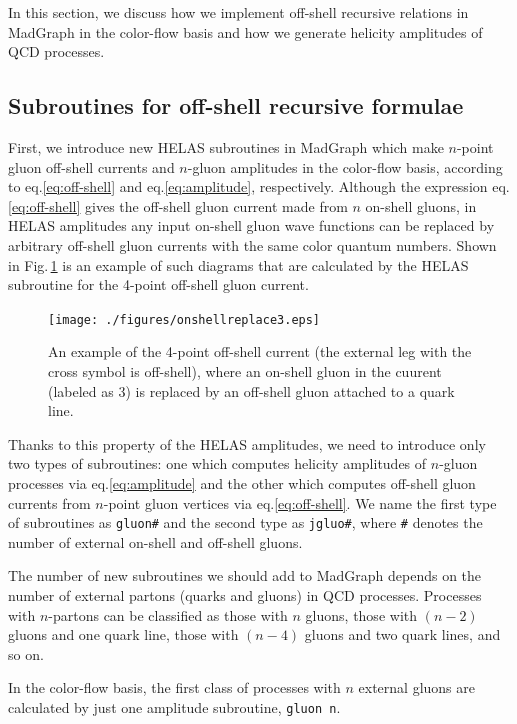 \documentclass[a4paper,11pt]{article}
\begin{document}
In this section, we discuss how we implement off-shell recursive
relations in MadGraph in the color-flow
basis and how we generate helicity amplitudes of QCD processes.

\subsection{Subroutines for off-shell recursive formulae}
First, we introduce new HELAS\cite{HELAS} subroutines in MadGraph which make
  $n$-point gluon off-shell currents and $n$-gluon amplitudes in the color-flow basis, according to
 eq.\eqref{eq:off-shell} and eq.\eqref{eq:amplitude},
  respectively. Although the expression eq.\eqref{eq:off-shell} gives
  the off-shell gluon current made from $n$
  on-shell gluons, in HELAS amplitudes any input on-shell gluon wave
  functions can be replaced by arbitrary off-shell gluon currents with the same
  color quantum numbers. Shown in
  Fig.\,\ref{fig:replace} is an
  example of such diagrams that are calculated by the HELAS subroutine for the
  4-point off-shell gluon current.
\begin{figure}
\begin{center}
\texttt{[image: ./figures/onshellreplace3.eps]}
\caption{An example of the 4-point off-shell
 current (the external leg with the cross symbol is off-shell), where an
 on-shell gluon in the cuurent (labeled as 3) is replaced by an off-shell gluon attached to
 a quark line.}
\label{fig:replace}
\end{center}
\end{figure}
Thanks to this property of the HELAS
  amplitudes, we need to introduce only two types of subroutines: one which computes
   helicity amplitudes of $n$-gluon processes via
  eq.\eqref{eq:amplitude} and the other which computes off-shell gluon
  currents from $n$-point gluon vertices via eq.\eqref{eq:off-shell}. We
  name the first type of subroutines as {\tt gluon\#} and the second
  type as
  {\tt jgluo\#}, where {\tt \#} denotes the number of external on-shell
  and off-shell gluons.

The number of new subroutines we should
  add to MadGraph depends on the number of external partons (quarks and
  gluons) in QCD
  processes. Processes with $n$-partons can be classified as those
  with $n$ gluons, those with $(n-2)$ gluons and one quark line, those
  with $(n-4)$ gluons and two quark lines, and so on.

In the color-flow basis,
  the first class of processes with $n$ external gluons are calculated
  by just one amplitude subroutine, {\tt gluon\,n}.
\end{document}
